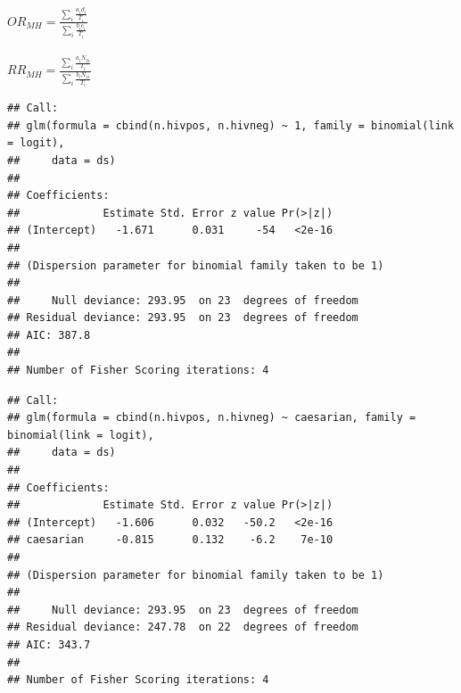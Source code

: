 \documentclass[landscape,twocolumn,letterpaper,9pt,reqno]{article}\usepackage[]{graphicx}\usepackage[]{color}
\newenvironment{knitrout}{}{} %
\begin{document}
$OR_{MH} = \frac{\sum_i \frac{a_i d_i}{T_i}}{\sum_i \frac{b_i c_i}{T_i}}$ \\ \ \\
$RR_{MH} = \frac{\sum_i \frac{a_i N_{0i}}{T_i}}{\sum_i \frac{b_i N_{1i}}{T_i}}$

\clearpage

\begin{knitrout}\small
{}\color{fgcolor}
\begin{verbatim}
## Call:
## glm(formula = cbind(n.hivpos, n.hivneg) ~ 1, family = binomial(link = logit), 
##     data = ds)
## 
## Coefficients:
##             Estimate Std. Error z value Pr(>|z|)
## (Intercept)   -1.671      0.031     -54   <2e-16
## 
## (Dispersion parameter for binomial family taken to be 1)
## 
##     Null deviance: 293.95  on 23  degrees of freedom
## Residual deviance: 293.95  on 23  degrees of freedom
## AIC: 387.8
## 
## Number of Fisher Scoring iterations: 4
\end{verbatim}

\end{knitrout}


\begin{knitrout}\small
{}\color{fgcolor}
\begin{verbatim}
## Call:
## glm(formula = cbind(n.hivpos, n.hivneg) ~ caesarian, family = binomial(link = logit), 
##     data = ds)
## 
## Coefficients:
##             Estimate Std. Error z value Pr(>|z|)
## (Intercept)   -1.606      0.032   -50.2   <2e-16
## caesarian     -0.815      0.132    -6.2    7e-10
## 
## (Dispersion parameter for binomial family taken to be 1)
## 
##     Null deviance: 293.95  on 23  degrees of freedom
## Residual deviance: 247.78  on 22  degrees of freedom
## AIC: 343.7
## 
## Number of Fisher Scoring iterations: 4
\end{verbatim}

\end{knitrout}

\clearpage

\vspace{-0.3in}
\end{document}

